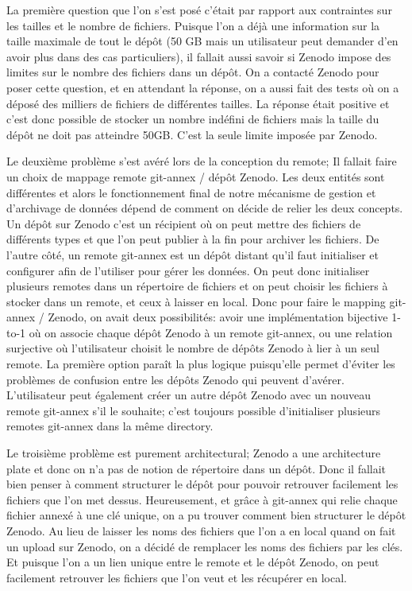\documentclass[11pt]{article}
\begin{document}
La première question que l’on s’est posé c’était par rapport aux
contraintes sur les tailles et le nombre de fichiers. Puisque l’on a
déjà une information sur la taille maximale de tout le dépôt (50 GB
mais un utilisateur peut demander d’en avoir plus dans des cas
particuliers), il fallait aussi savoir si Zenodo impose des limites
sur le nombre des fichiers dans un dépôt. On a contacté Zenodo pour
poser cette question, et en attendant la réponse, on a aussi fait des
tests où on a déposé des milliers de fichiers de différentes
tailles. La réponse était positive et c'est donc possible de stocker
un nombre indéfini de fichiers mais la taille du dépôt ne doit pas
atteindre 50GB. C'est la seule limite imposée par Zenodo.


Le deuxième problème s’est avéré lors de la conception du remote; Il
fallait faire un choix de mappage remote git-annex / dépôt Zenodo. Les
deux entités sont différentes et alors le fonctionnement final de
notre mécanisme de gestion et d’archivage de données dépend de comment
on décide de relier les deux concepts. Un dépôt sur Zenodo c’est un
récipient où on peut mettre des fichiers de différents types et que
l’on peut publier à la fin pour archiver les fichiers. De l’autre
côté, un remote git-annex est un dépôt distant qu’il faut initialiser
et configurer afin de l’utiliser pour gérer les données. On peut donc
initialiser plusieurs remotes dans un répertoire de fichiers et on
peut choisir les fichiers à stocker dans un remote, et ceux à laisser
en local. Donc pour faire le mapping git-annex / Zenodo, on avait deux
possibilités: avoir une implémentation bijective 1-to-1 où on associe
chaque dépôt Zenodo à un remote git-annex, ou une relation surjective
où l’utilisateur choisit le nombre de dépôts Zenodo à lier à un seul
remote. La première option paraît la plus logique puisqu’elle permet
d’éviter les problèmes de confusion entre les dépôts Zenodo qui
peuvent d’avérer. L’utilisateur peut également créer un autre dépôt
Zenodo avec un nouveau remote git-annex s’il le souhaite; c'est
toujours possible d'initialiser plusieurs remotes git-annex dans la
même directory.


Le troisième problème est purement architectural; Zenodo a une
architecture plate et donc on n’a pas de notion de répertoire dans un
dépôt. Donc il fallait bien penser à comment structurer le dépôt pour
pouvoir retrouver facilement les fichiers que l’on met
dessus. Heureusement, et grâce à git-annex qui relie chaque fichier
annexé à une clé unique, on a pu trouver comment bien structurer le
dépôt Zenodo. Au lieu de laisser les noms des fichiers que l’on a en
local quand on fait un upload sur Zenodo, on a décidé de remplacer les
noms des fichiers par les clés. Et puisque l’on a un lien unique entre
le remote et le dépôt Zenodo, on peut facilement retrouver les
fichiers que l’on veut et les récupérer en local.
\end{document}
